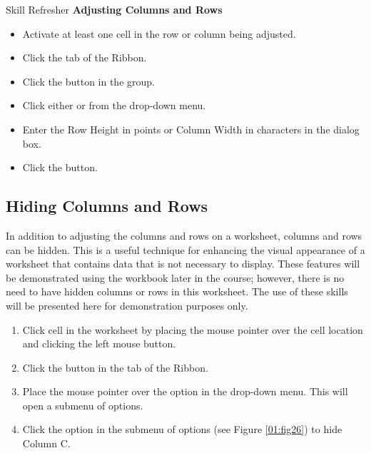 \begin{center}
	\begin{sklbox}{Skill Refresher}
		\textbf{Adjusting Columns and Rows}
		\\
		\begin{itemize}
			\setlength{\itemsep}{0pt}
			\setlength{\parskip}{0pt}
			\setlength{\parsep}{0pt}
			
			\item Activate at least one cell in the row or column being adjusted.
			\item Click the  tab of the Ribbon.
			\item Click the  button in the  group.
			\item Click either  or  from the drop-down menu.
			\item Enter the Row Height in points or Column Width in characters in the dialog box.
			\item Click the  button.
			
		\end{itemize}
	\end{sklbox}
\end{center}

\subsection{Hiding Columns and Rows}

In addition to adjusting the columns and rows on a worksheet, columns and rows can be hidden. This is a useful technique for enhancing the visual appearance of a worksheet that contains data that is not necessary to display. These features will be demonstrated using the  workbook later in the course; however, there is no need to have hidden columns or rows in this worksheet. The use of these skills will be presented here for demonstration purposes only.

\begin{enumerate}
	\item Click cell  in the  worksheet by placing the mouse pointer over the cell location and clicking the left mouse button.
	\item Click the  button in the  tab of the Ribbon.
	\item Place the mouse pointer over the  option in the drop-down menu. This will open a submenu of options.
	\item Click the  option in the submenu of options (see Figure \ref{01:fig26}) to hide Column C.
\end{enumerate}

